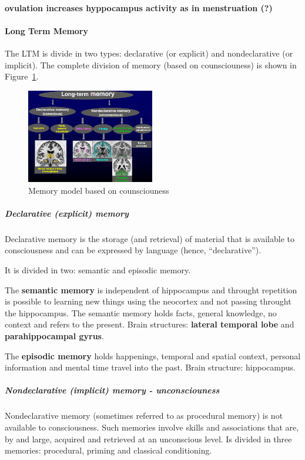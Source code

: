 \documentclass[12pt,article,oneside,a4paper]{memoir}
\begin{document}
\paragraph{ovulation increases hyppocampus activity as in menstruation (?)}

\paragraph{Long Term Memory}
The LTM is divide in two types: declarative (or explicit) and nondeclarative
(or implicit). The complete division of memory (based on counsciouness) is
shown in Figure~\ref{fig:old-memory-model}.

\begin{figure}[h]
  \centering
  \includegraphics[width=0.5\textwidth]{imgs/old-memory-model.png}
  \caption{Memory model based on counsciouness}
  \label{fig:old-memory-model}
\end{figure}

\subparagraph{Declarative (explicit) memory}
Declarative memory is the storage (and retrieval) of material that is available
to consciousness and can be expressed by language (hence, ``declarative'').

It is divided in two: semantic and episodic memory.

The \textbf{semantic memory} is independent of hippocampus and throught
repetition is possible to learning new things using the neocortex and not
passing throught the hippocampus. The semantic memory holds facts, general
knowledge, no context and refers to the present.
Brain structures: \textbf{lateral temporal lobe} and \textbf{parahippocampal
gyrus}.

The \textbf{episodic memory} holds happenings, temporal and spatial
context, personal information and mental time travel into the past.
Brain structure: hippocampus.

\subparagraph{Nondeclarative (implicit) memory - unconsciouness}
Nondeclarative memory (sometimes referred to as procedural memory) is not
available to consciousness. Such memories involve skills and associations 
that are, by and large, acquired and retrieved at an unconscious level.
Is divided in three memories: procedural, priming and classical conditioning.
\end{document}
